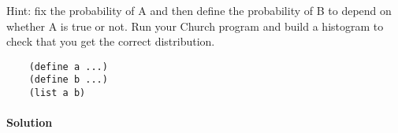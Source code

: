 Hint: fix the probability of A and then define the probability of B to depend on whether A is true or not. 
Run your Church program and build a histogram to check that you get the correct distribution.

\begin{lstlisting}
    (define a ...)
    (define b ...)
    (list a b)
\end{lstlisting}

\paragraph{Solution}